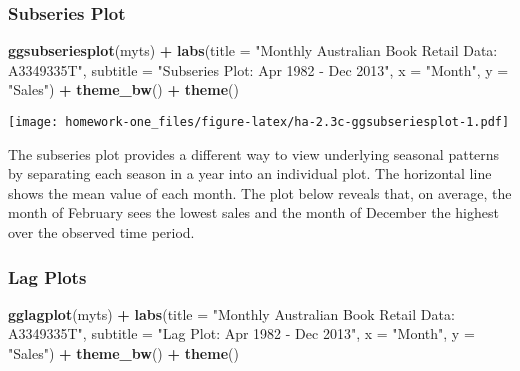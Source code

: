 \documentclass[openany]{book}
\newenvironment{Shaded}{\begin{snugshade}}{\end{snugshade}}
\newcommand{\DataTypeTok}[1]{\textcolor[rgb]{0.13,0.29,0.53}{#1}}
\newcommand{\KeywordTok}[1]{\textcolor[rgb]{0.13,0.29,0.53}{\textbf{#1}}}
\newcommand{\NormalTok}[1]{#1}
\newcommand{\OperatorTok}[1]{\textcolor[rgb]{0.81,0.36,0.00}{\textbf{#1}}}
\newcommand{\StringTok}[1]{\textcolor[rgb]{0.31,0.60,0.02}{#1}}
\begin{document}
\hypertarget{subseries-plot}{%
\subsubsection{Subseries Plot}\label{subseries-plot}}

\begin{Shaded}
\begin{Highlighting}[]
\KeywordTok{ggsubseriesplot}\NormalTok{(myts) }\OperatorTok{+}\StringTok{ }\KeywordTok{labs}\NormalTok{(}\DataTypeTok{title =} \StringTok{"Monthly Australian Book Retail Data: A3349335T"}\NormalTok{, }
  \DataTypeTok{subtitle =} \StringTok{"Subseries Plot: Apr 1982 - Dec 2013"}\NormalTok{, }\DataTypeTok{x =} \StringTok{"Month"}\NormalTok{, }
  \DataTypeTok{y =} \StringTok{"Sales"}\NormalTok{) }\OperatorTok{+}\StringTok{ }\KeywordTok{theme_bw}\NormalTok{() }\OperatorTok{+}\StringTok{ }\KeywordTok{theme}\NormalTok{()}
\end{Highlighting}
\end{Shaded}

\texttt{[image: homework-one\_files/figure-latex/ha-2.3c-ggsubseriesplot-1.pdf]}

The subseries plot provides a different way to view underlying seasonal patterns by separating each season in a year into an individual plot. The horizontal line shows the mean value of each month. The plot below reveals that, on average, the month of February sees the lowest sales and the month of December the highest over the observed time period.

\hypertarget{lag-plots}{%
\subsubsection{Lag Plots}\label{lag-plots}}

\begin{Shaded}
\begin{Highlighting}[]
\KeywordTok{gglagplot}\NormalTok{(myts) }\OperatorTok{+}\StringTok{ }\KeywordTok{labs}\NormalTok{(}\DataTypeTok{title =} \StringTok{"Monthly Australian Book Retail Data: A3349335T"}\NormalTok{, }
  \DataTypeTok{subtitle =} \StringTok{"Lag Plot: Apr 1982 - Dec 2013"}\NormalTok{, }\DataTypeTok{x =} \StringTok{"Month"}\NormalTok{, }
  \DataTypeTok{y =} \StringTok{"Sales"}\NormalTok{) }\OperatorTok{+}\StringTok{ }\KeywordTok{theme_bw}\NormalTok{() }\OperatorTok{+}\StringTok{ }\KeywordTok{theme}\NormalTok{()}
\end{Highlighting}
\end{Shaded}
\end{document}
